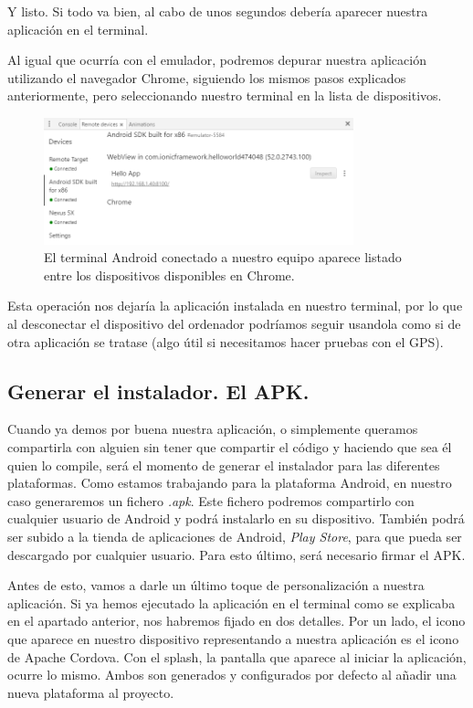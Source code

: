 Y listo. Si todo va bien, al cabo de unos segundos debería aparecer nuestra aplicación en el terminal.

Al igual que ocurría con el emulador, podremos depurar nuestra aplicación utilizando el navegador Chrome, siguiendo los mismos pasos explicados anteriormente, pero seleccionando nuestro terminal en la lista de dispositivos.

\begin{figure}[H]
\centering
    \centering
        \includegraphics[width=0.8\textwidth]{Figures/ch2/BuildAndEmulate/remote_devices_list_nexus5}
    \caption{El terminal Android conectado a nuestro equipo aparece listado entre los dispositivos disponibles en Chrome.}
\end{figure}

Esta operación nos dejaría la aplicación instalada en nuestro terminal, por lo que al desconectar el dispositivo del ordenador podríamos seguir usandola como si de otra aplicación se tratase (algo útil si necesitamos hacer pruebas con el \gls{GPS}).

\subsection{Generar el instalador. El APK.}

Cuando ya demos por buena nuestra aplicación, o simplemente queramos compartirla con alguien sin tener que compartir el código y haciendo que sea él quien lo compile, será el momento de generar el instalador para las diferentes plataformas. Como estamos trabajando para la plataforma Android, en nuestro caso generaremos un fichero \emph{.apk}. Este fichero podremos compartirlo con cualquier usuario de Android y podrá instalarlo en su dispositivo. También podrá ser subido a la tienda de aplicaciones de Android, \emph{Play Store}, para que pueda ser descargado por cualquier usuario. Para esto último, será necesario firmar el \gls{APK}.

Antes de esto, vamos a darle un último toque de personalización a nuestra aplicación. Si ya hemos ejecutado la aplicación en el terminal como se explicaba en el apartado anterior, nos habremos fijado en dos detalles. Por un lado, el icono que aparece en nuestro dispositivo representando a nuestra aplicación es el icono de Apache Cordova. Con el splash, la pantalla que aparece al iniciar la aplicación, ocurre lo mismo. Ambos son generados y configurados por defecto al añadir una nueva plataforma al proyecto.

